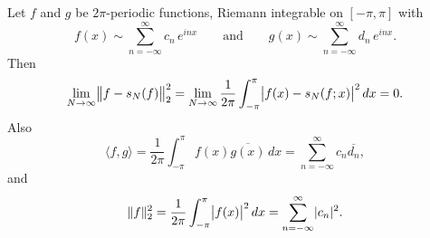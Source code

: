 \begin{samepage}
\begin{thm} 
Let $f$ and $g$ be $2\pi$-periodic functions, Riemann integrable 
on $[-\pi,\pi]$
with
\begin{equation*}
f(x) \sim
\sum_{n=-\infty}^\infty c_n \,e^{inx}
\qquad \text{and} \qquad
g(x) \sim
\sum_{n=-\infty}^\infty d_n \,e^{inx} .
\end{equation*}
Then
\begin{equation*}
\lim_{N\to\infty} \bigl\lVert {f-s_N(f)} \bigr\rVert_2^2 = 
\lim_{N\to\infty}
\frac{1}{2\pi}
\int_{-\pi}^\pi
\bigl\lvert {f(x)-s_N(f;x)} \bigr\rvert^2 \, dx
=0 .
\end{equation*}
Also
\begin{equation*}
\langle f , g \rangle =
\frac{1}{2\pi}
\int_{-\pi}^\pi
f(x) \overline{g(x)}\, dx
=
\sum_{n=-\infty}^\infty c_n \overline{d_n} ,
\end{equation*}
and
\begin{equation*}
\lVert {f} \rVert_2^2
=
\frac{1}{2\pi}
\int_{-\pi}^\pi
\bigl\lvert {f(x)} \bigr\rvert^2 \, dx
=
\sum_{n=-\infty}^\infty \lvert {c_n} \rvert^2.
\end{equation*}
\end{thm}
\end{samepage}

